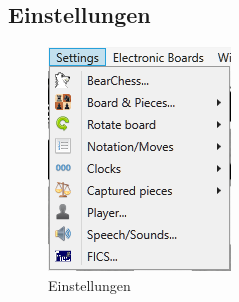 \documentclass[11pt,a4paper]{article}
\begin{document}
	\subsection{Einstellungen}
	\begin{figure}[H]
		\centering
		\includegraphics[scale=1.0]{Settings.png}
		\caption{Einstellungen}
		\label{fig:Settings}
	\end{figure}
\end{document}
